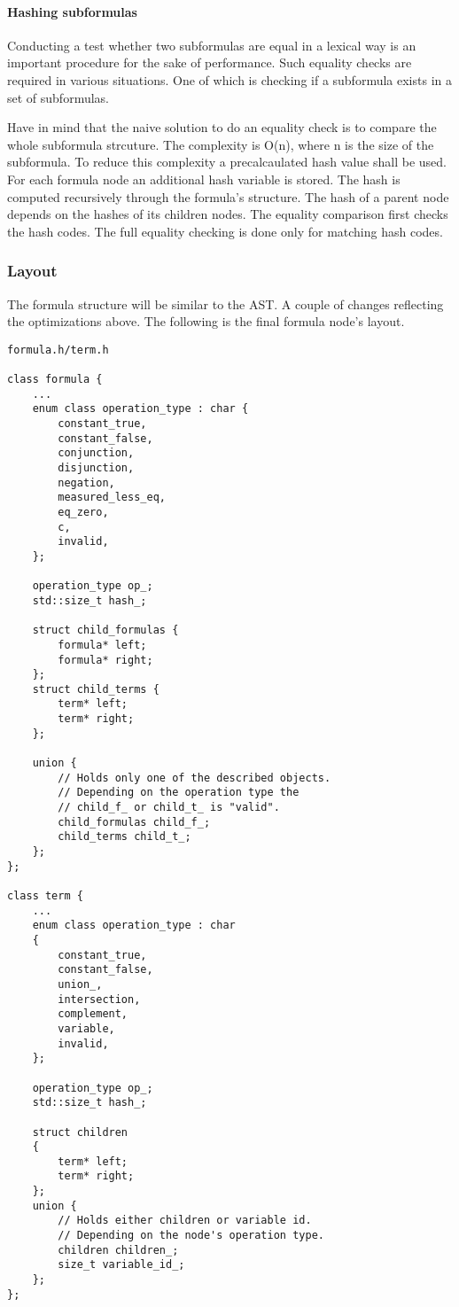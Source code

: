 \documentclass{article}
\begin{document}
	\paragraph{Hashing subformulas}
	Conducting a test whether two subformulas are equal in a lexical way is an important procedure for the sake of performance. Such equality checks are required in various situations. One of which is checking if a subformula exists in a set of subformulas.

	Have in mind that the naive solution to do an equality check is to compare the whole subformula strcuture. The complexity is O(n), where n is the size of the subformula. To reduce this complexity a precalcaulated hash value shall be used.
	For each formula node an additional hash variable is stored. The hash is computed recursively through the formula's structure. The hash of a parent node depends on the hashes of its children nodes. 
	The equality comparison first checks the hash codes. The full equality checking is done only for matching hash codes.

	\newpage
	\subsubsection{Layout}
	The formula structure will be similar to the AST. A couple of changes reflecting the optimizations above. The following is the final formula node's layout.

\begin{lstlisting}
formula.h/term.h

class formula {
    ...
    enum class operation_type : char {
        constant_true,
        constant_false,
        conjunction,
        disjunction,
        negation,
        measured_less_eq,
        eq_zero,
        c,
        invalid,
    };

    operation_type op_;
    std::size_t hash_;

    struct child_formulas {
        formula* left;
        formula* right;
    };
    struct child_terms {
        term* left;
        term* right;
    };

    union {
        // Holds only one of the described objects.
        // Depending on the operation type the
        // child_f_ or child_t_ is "valid".
        child_formulas child_f_;
        child_terms child_t_;
    };
};

class term {
    ...
    enum class operation_type : char
    {
        constant_true,
        constant_false,
        union_,
        intersection,
        complement,
        variable,
        invalid,
    };

    operation_type op_;
    std::size_t hash_;

    struct children
    {
        term* left;
        term* right;
    };
    union {
        // Holds either children or variable id.
        // Depending on the node's operation type.
        children children_;
        size_t variable_id_;
    };
};
\end{lstlisting}
\end{document}
